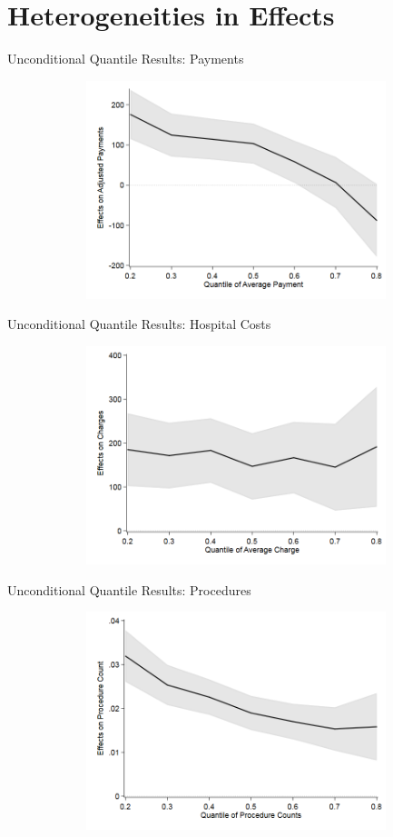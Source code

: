 \documentclass[t,aspectratio=169]{beamer}
\begin{document}
\section{Heterogeneities in Effects}
\begin{frame}{Unconditional Quantile Results: Payments}
    \begin{figure}
        \centering
        \includegraphics[height=2.5in,width=5in,keepaspectratio]{QReg_Payment}
    \end{figure}
\end{frame}

\begin{frame}{Unconditional Quantile Results: Hospital Costs}
    \begin{figure}
        \centering
        \includegraphics[height=2.5in,width=5in,keepaspectratio]{QReg_Charge}
    \end{figure}
\end{frame}

\begin{frame}{Unconditional Quantile Results: Procedures}
    \begin{figure}
        \centering
        \includegraphics[height=2.5in,width=5in,keepaspectratio]{QReg_Procs}
    \end{figure}
\end{frame}
\end{document}
